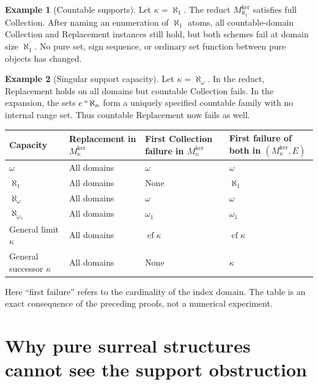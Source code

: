 \documentclass[11pt,letterpaper]{article}
\theoremstyle{definition}
\newtheorem{example}[example]{Example}\aliascntresetthe{example}
\theoremstyle{remark}
\newcommand{\cf}{\operatorname{cf}}
\newcommand{\Mker}{M^{\mathrm{ker}}}
\begin{document}
\begin{example}[Countable supports]
Let $\kappa=\aleph_1$. The reduct $\Mker_{\aleph_1}$ satisfies full Collection. After naming an enumeration of $\aleph_1$ atoms, all countable-domain Collection and Replacement instances still hold, but both schemes fail at domain size $\aleph_1$. No pure set, sign sequence, or ordinary set function between pure objects has changed.
\end{example}

\begin{example}[Singular support capacity]
Let $\kappa=\aleph_\omega$. In the reduct, Replacement holds on all domains but countable Collection fails. In the expansion, the sets $e\,``\,\aleph_n$ form a uniquely specified countable family with no internal range set. Thus countable Replacement now fails as well.
\end{example}

\begin{center}
\small
\begin{tabularx}{\textwidth}{@{}l>{\raggedright\arraybackslash}X>{\raggedright\arraybackslash}X>{\raggedright\arraybackslash}X@{}}
\toprule
Capacity & Replacement in $\Mker_\kappa$ & First Collection failure in $\Mker_\kappa$ & First failure of both in $(\Mker_\kappa,E)$ \\
\midrule
$\omega$ & All domains & $\omega$ & $\omega$ \\
$\aleph_1$ & All domains & None & $\aleph_1$ \\
$\aleph_\omega$ & All domains & $\omega$ & $\omega$ \\
$\aleph_{\omega_1}$ & All domains & $\omega_1$ & $\omega_1$ \\
General limit $\kappa$ & All domains & $\cf\kappa$ & $\cf\kappa$ \\
General successor $\kappa$ & All domains & None & $\kappa$ \\
\bottomrule
\end{tabularx}
\end{center}
Here ``first failure'' refers to the cardinality of the index domain. The table is an exact consequence of the preceding proofs, not a numerical experiment.

\section{Why pure surreal structures cannot see the support obstruction}
\label{hset:zr:sec:blindness}
\end{document}

